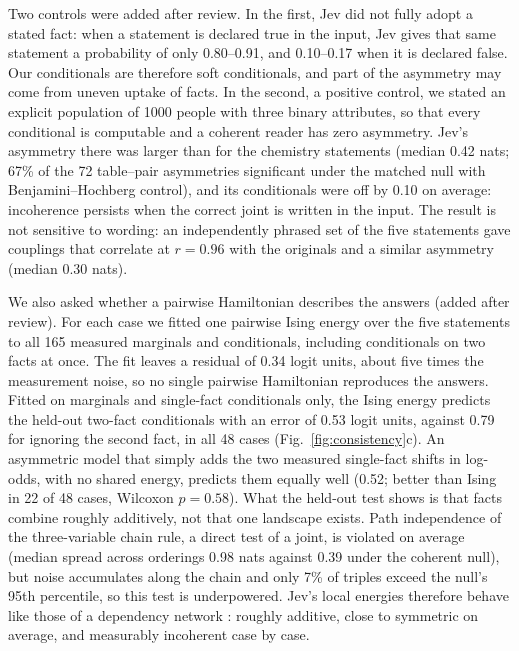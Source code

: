 \documentclass[11pt]{article}
\newcommand{\jev}{Jev}
\begin{document}
Two controls were added after review.
In the first, \jev{} did not fully adopt a stated fact: when a statement is declared true in the input, \jev{} gives that same statement a probability of only 0.80--0.91, and 0.10--0.17 when it is declared false.
Our conditionals are therefore soft conditionals, and part of the asymmetry may come from uneven uptake of facts.
In the second, a positive control, we stated an explicit population of 1000 people with three binary attributes, so that every conditional is computable and a coherent reader has zero asymmetry.
\jev{}'s asymmetry there was larger than for the chemistry statements (median 0.42 nats; 67\% of the 72 table--pair asymmetries significant under the matched null with Benjamini--Hochberg control), and its conditionals were off by 0.10 on average: incoherence persists when the correct joint is written in the input.
The result is not sensitive to wording: an independently phrased set of the five statements gave couplings that correlate at $r=0.96$ with the originals and a similar asymmetry (median 0.30 nats).

We also asked whether a pairwise Hamiltonian describes the answers (added after review).
For each case we fitted one pairwise Ising energy over the five statements to all 165 measured marginals and conditionals, including conditionals on two facts at once.
The fit leaves a residual of 0.34 logit units, about five times the measurement noise, so no single pairwise Hamiltonian reproduces the answers.
Fitted on marginals and single-fact conditionals only, the Ising energy predicts the held-out two-fact conditionals with an error of 0.53 logit units, against 0.79 for ignoring the second fact, in all 48 cases (Fig.~\ref{fig:consistency}c).
An asymmetric model that simply adds the two measured single-fact shifts in log-odds, with no shared energy, predicts them equally well (0.52; better than Ising in 22 of 48 cases, Wilcoxon $p=0.58$).
What the held-out test shows is that facts combine roughly additively, not that one landscape exists.
Path independence of the three-variable chain rule, a direct test of a joint, is violated on average (median spread across orderings 0.98 nats against 0.39 under the coherent null), but noise accumulates along the chain and only 7\% of triples exceed the null's 95th percentile, so this test is underpowered.
\jev{}'s local energies therefore behave like those of a dependency network \citep{heckerman2000dependency}: roughly additive, close to symmetric on average, and measurably incoherent case by case.
\end{document}
